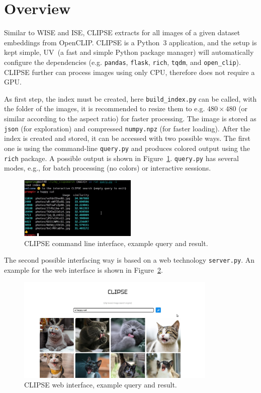 \documentclass{article}
\begin{document}
\section{Overview}
Similar to WISE and ISE, CLIPSE extracts for all images of a given dataset embeddings from OpenCLIP.
CLIPSE is a Python~3 application, and the setup is kept simple, UV~\cite{uv}(a fast and simple Python package manager) will automatically configure the dependencies (e.g. \texttt{pandas}, \texttt{flask}, \texttt{rich}, \texttt{tqdm}, and \texttt{open\_clip}).
CLIPSE further can process images using only CPU, therefore does not require a GPU.

As first step, the index must be created, here \lstinline[language={bash}]{build_index.py} can be called, with the folder of the images, it is recommended to resize them to e.g. $480\times480$ (or similar according to the aspect ratio) for faster processing.
The image is stored as \texttt{json} (for exploration) and compressed \lstinline[language={python}]{numpy.npz} (for faster loading).
After the index is created and stored, it can be accessed with two possible ways.
The first one is using the command-line \lstinline[language={bash}]{query.py} and produces colored output using the \texttt{rich} package.
A possible output is shown in Figure~\ref{fig:cli}.
\lstinline[language={bash}]{query.py} has several modes, e.g., for batch processing (no colors) or interactive sessions.

\begin{figure}
\centering
\includegraphics[width=0.5\textwidth]{CLI.jpg}
\caption{CLIPSE command line interface, example query and result.}
\label{fig:cli}
\end{figure}

The second possible interfacing way is based on a web technology \lstinline[language={bash}]{server.py}.
An example for the web interface is shown in Figure~\ref{fig:web}.

\begin{figure}
\centering
\includegraphics[width=0.85\textwidth]{WEB.jpg}
\caption{CLIPSE web interface, example query and result.}
\label{fig:web}
\end{figure}
\end{document}
